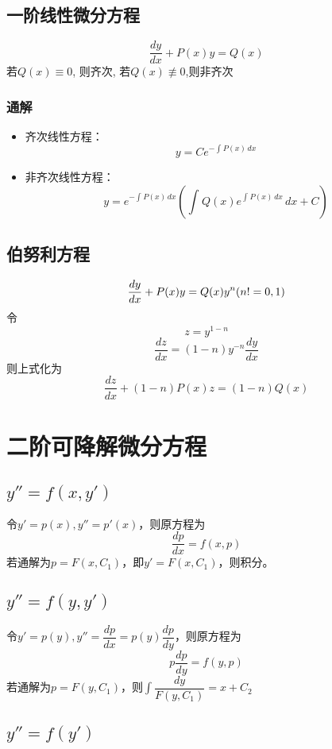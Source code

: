 \subsection{一阶线性微分方程}
\[\dfrac{dy}{dx} + P(x)y = Q(x)\]
若\(Q(x) \equiv 0\), 则齐次, 若\(Q(x) \not\equiv 0\),则非齐次

\subsubsection{通解}
\begin{itemize}
    \item 齐次线性方程：\[y = Ce^{-\int_{}^{} P(x) \,dx}\]
    \item 非齐次线性方程：\[y = e^{-\int_{}^{} P(x) \,dx}(\int_{}^{}Q(x)e^{\int_{}^{}P(x) \,dx} \,dx + C)\]
\end{itemize}


\subsection{伯努利方程}
\[\dfrac{dy}{dx} + P(x)y = Q(x)y^{n}\space (n != 0, 1)\]
令\[z = y^{1 - n}\]
\[\dfrac{dz}{dx} = (1 - n)y^{-n}\dfrac{dy}{dx}\]
则上式化为\[\dfrac{dz}{dx} + (1 - n)P(x)z = (1 - n)Q(x)\]


\section{二阶可降解微分方程}

\subsection{\(y'' = f(x, y')\)}

令\(y' = p(x), y'' = p'(x)\)，则原方程为\[\dfrac{dp}{dx} = f(x, p)\]
若通解为\(p = F(x, C_1)\)，即\(y' = F(x, C_1)\)，则积分。


\subsection{\(y'' = f(y, y')\)}

令\(y' = p(y), y'' = \dfrac{dp}{dx} = p(y)\dfrac{dp}{dy}\)，则原方程为\[p\dfrac{dp}{dy} = f(y, p)\]
若通解为\(p = F(y, C_1)\)，则\(\int\dfrac{dy}{F(y, C_1)} = x + C_2\)

\subsection{\(y'' = f(y')\)}

